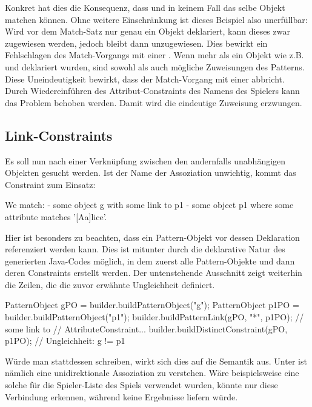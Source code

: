 Konkret hat dies die Konsequenz, dass  und  in keinem Fall das selbe Objekt matchen können.
Ohne weitere Einschränkung ist dieses Beispiel also unerfüllbar:
Wird vor dem Match-Satz nur genau ein Objekt deklariert, kann dieses zwar  zugewiesen werden, jedoch bleibt dann  unzugewiesen.
Dies bewirkt ein Fehlschlagen des Match-Vorgangs mit einer .
Wenn mehr als ein Objekt wie z.B.\  und  deklariert wurden, sind sowohl  als auch  mögliche Zuweisungen des Patterns.
Diese Uneindeutigkeit bewirkt, dass der Match-Vorgang mit einer  abbricht.
Durch Wiedereinführen des Attribut-Constraints des Namens des Spielers kann das Problem behoben werden.
Damit wird die eindeutige Zuweisung  erzwungen.

\subsection{Link-Constraints}

Es soll nun nach einer Verknüpfung zwischen den andernfalls unabhängigen Objekten gesucht werden.
Ist der Name der Assoziation unwichtig, kommt das Constraint  zum Einsatz:

\begin{mdcodeblock}
    We match:
    - some object g with some link to p1
    - some object p1 where some attribute matches '[Aa]lice'.
\end{mdcodeblock}

Hier ist besonders zu beachten, dass ein Pattern-Objekt vor dessen Deklaration referenziert werden kann.
Dies ist mitunter durch die deklarative Natur des generierten Java-Codes möglich,
in dem zuerst alle Pattern-Objekte und dann deren Constraints erstellt werden.
Der untenstehende Ausschnitt zeigt weiterhin die Zeilen, die die zuvor erwähnte Ungleichheit definiert.

\begin{jcodeblock}
    PatternObject gPO = builder.buildPatternObject("g");
    PatternObject p1PO = builder.buildPatternObject("p1");
    builder.buildPatternLink(gPO, "*", p1PO); // some link to
    // AttributeConstraint...
    builder.buildDistinctConstraint(gPO, p1PO); // Ungleichheit: g != p1
\end{jcodeblock}

Würde man stattdessen  schreiben,
wirkt sich dies auf die Semantik aus.
Unter  ist nämlich eine unidirektionale Assoziation zu verstehen.
Wäre beispielsweise eine solche für die Spieler-Liste des Spiels verwendet wurden,
könnte nur  diese Verbindung erkennen,
während  keine Ergebnisse liefern würde.

